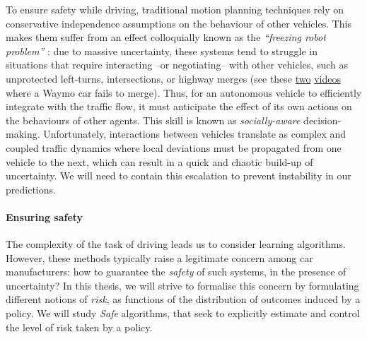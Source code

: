 To ensure safety while driving, traditional motion planning techniques rely on conservative independence assumptions on the behaviour of other vehicles. This makes them suffer from an effect colloquially known as the \emph{\enquote{freezing robot problem}} \citep{Trautman2010}: due to massive uncertainty, these systems tend to struggle in situations that require interacting --or negotiating-- with other vehicles, such as unprotected left-turns, intersections, or highway merges (see \eg these \href{https://www.youtube.com/watch?v=HjtiiGCe1pE}{two} \href{https://twitter.com/nitguptaa/status/990683818825736192}{videos} where a Waymo car fails to merge). 
Thus, for an autonomous vehicle to efficiently integrate with the traffic flow, it must anticipate the effect of its own actions on the behaviours of other agents. This skill is known as \emph{socially-aware} decision-making. Unfortunately, interactions between vehicles translate as complex and coupled traffic dynamics where local deviations must be propagated from one vehicle to the next, which can result in a quick and chaotic build-up of uncertainty. We will need to contain this escalation to prevent instability in our predictions.

\paragraph{Ensuring safety}

The complexity of the task of driving leads us to consider learning algorithms. However, these methods typically raise a legitimate concern among car manufacturers: how to guarantee the \emph{safety} of such systems, in the presence of uncertainty? In this thesis, we will strive to formalise this concern by formulating different notions of \emph{risk}, as functions of the distribution of outcomes induced by a policy. We will study \emph{Safe}  algorithms, that seek to explicitly estimate and control the level of risk taken by a policy.

